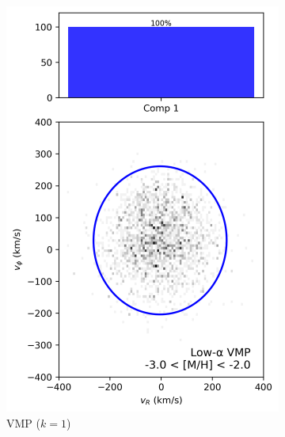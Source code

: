 \documentclass[a4paper,12pt]{article}
\begin{document}
\begin{figure}[H]
  \centering
  \begin{subfigure}{0.24\linewidth}
    \centering
    \includegraphics[width=\linewidth]{../figures/gmm_vmp_low_alpha_k1.png}
    \caption{VMP ($k{=}1$)}
    \label{fig:gmm_vmp_lo}
  \end{subfigure}\hfill
  \begin{subfigure}{0.24\linewidth}
    \centering

\end{subfigure}
\end{figure}
\end{document}
